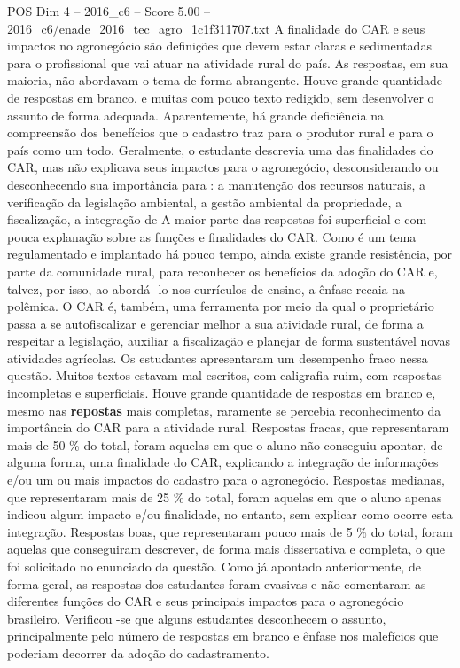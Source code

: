 \begin{textsample}{POS Dim 4 – 2016\_c6 – Score 5.00 – 2016\_c6/enade\_2016\_tec\_agro\_1c1f311707.txt}
A finalidade do CAR e seus impactos no agronegócio são definições que devem estar claras e sedimentadas para o profissional que vai atuar na atividade rural do país.
As respostas, em sua maioria, não abordavam o tema de forma abrangente.
Houve grande quantidade de respostas em branco, e muitas com pouco texto redigido, sem desenvolver o assunto de forma adequada.
Aparentemente, há grande deficiência na compreensão dos benefícios que o cadastro traz para o produtor rural e para o país como um todo.
Geralmente, o estudante descrevia uma das finalidades do CAR, mas não explicava seus impactos para o agronegócio, desconsiderando ou desconhecendo sua importância para : a manutenção dos recursos naturais, a verificação da legislação ambiental, a gestão ambiental da propriedade, a fiscalização, a integração de A maior parte das respostas foi superficial e com pouca explanação sobre as funções e finalidades do CAR.
Como é um tema regulamentado e implantado há pouco tempo, ainda existe grande resistência, por parte da comunidade rural, para reconhecer os benefícios da adoção do CAR e, talvez, por isso, ao abordá -lo nos currículos de ensino, a ênfase recaia na polêmica.
O CAR é, também, uma ferramenta por meio da qual o proprietário passa a se autofiscalizar e gerenciar melhor a sua atividade rural, de forma a respeitar a legislação, auxiliar a fiscalização e planejar de forma sustentável novas atividades agrícolas.
Os estudantes apresentaram um desempenho fraco nessa questão.
Muitos textos estavam mal escritos, com caligrafia ruim, com respostas incompletas e superficiais.
Houve grande quantidade de respostas em branco e, mesmo nas \textbf{repostas} mais completas, raramente se percebia reconhecimento da importância do CAR para a atividade rural.
Respostas fracas, que representaram mais de 50 \% do total, foram aquelas em que o aluno não conseguiu apontar, de alguma forma, uma finalidade do CAR, explicando a integração de informações e/ou um ou mais impactos do cadastro para o agronegócio.
Respostas medianas, que representaram mais de 25 \% do total, foram aquelas em que o aluno apenas indicou algum impacto e/ou finalidade, no entanto, sem explicar como ocorre esta integração.
Respostas boas, que representaram pouco mais de 5 \% do total, foram aquelas que conseguiram descrever, de forma mais dissertativa e completa, o que foi solicitado no enunciado da questão.
Como já apontado anteriormente, de forma geral, as respostas dos estudantes foram evasivas e não comentaram as diferentes funções do CAR e seus principais impactos para o agronegócio brasileiro.
Verificou -se que alguns estudantes desconhecem o assunto, principalmente pelo número de respostas em branco e ênfase nos malefícios que poderiam decorrer da adoção do cadastramento.

\end{textsample}
